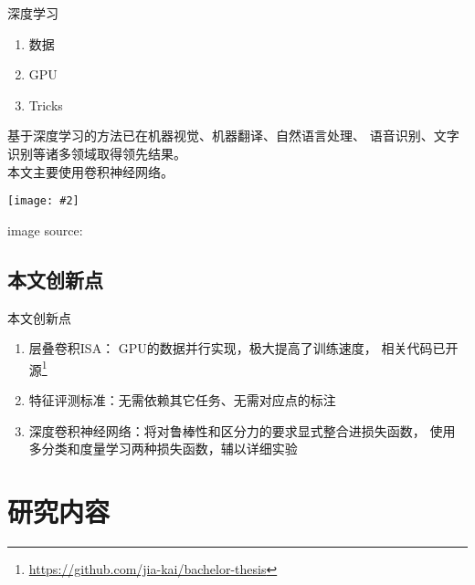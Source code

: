 \documentclass {beamer}
\newcommand{\addgraph}[2]{\begin{center}
\texttt{[image: \#2]}\end{center}}
\begin{document}
\begin{frame}{深度学习}
    \begin{enumerate}
        \item 数据
        \item GPU
        \item Tricks
    \end{enumerate}
    基于深度学习的方法已在机器视觉、机器翻译、自然语言处理、
    语音识别、文字识别等诸多领域取得领先结果。 \\
    本文主要使用卷积神经网络。

    \addgraph{0.5}{res/alexnet.png}
    \tiny{image source: \cite{krizhevsky2012imagenet}}
\end{frame}

\subsection{本文创新点}
\begin{frame}{本文创新点}
    \begin{enumerate}
        \item 层叠卷积ISA\cite{wu2013unsupervised}：
            GPU的数据并行实现，极大提高了训练速度，
            相关代码已开源\footnote{
                \url{https://github.com/jia-kai/bachelor-thesis}}
        \item 特征评测标准：无需依赖其它任务、无需对应点的标注
        \item 深度卷积神经网络：将对鲁棒性和区分力的要求显式整合进损失函数，
            使用多分类和度量学习两种损失函数，辅以详细实验
    \end{enumerate}
\end{frame}

\section{研究内容}
\end{document}
